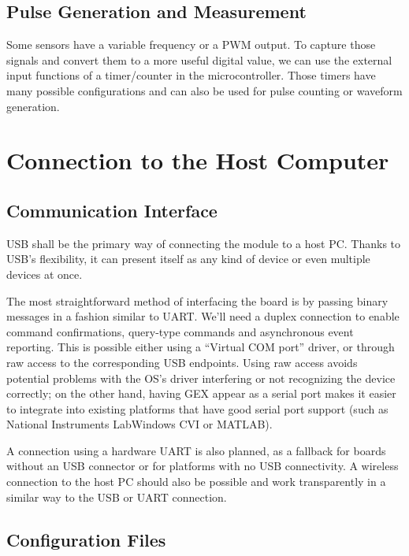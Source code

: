 \subsection{Pulse Generation and Measurement}

Some sensors have a variable frequency or a \gls{PWM} output. To capture those signals and convert them to a more useful digital value, we can use the external input functions of a timer/counter in the microcontroller. Those timers have many possible configurations and can also be used for pulse counting or waveform generation.

\section{Connection to the Host Computer}

\subsection{Communication Interface}

\gls{USB} shall be the primary way of connecting the module to a host \gls{PC}. Thanks to \gls{USB}'s flexibility, it can present itself as any kind of device or even multiple devices at once.

The most straightforward method of interfacing the board is by passing binary messages in a fashion similar to \gls{UART}. We'll need a duplex connection to enable command confirmations, query-type commands and asynchronous event reporting. This is possible either using a ``Virtual COM port'' driver, or through raw access to the corresponding \gls{USB} endpoints. Using raw access avoids potential problems with the \gls{OS}'s driver interfering or not recognizing the device correctly; on the other hand, having GEX appear as a serial port makes it easier to integrate into existing platforms that have good serial port support (such as National Instruments LabWindows CVI or MATLAB).

A connection using a hardware \gls{UART} is also planned, as a fallback for boards without an USB connector or for platforms with no \gls{USB} connectivity. A wireless connection to the host PC should also be possible and work transparently in a similar way to the \gls{USB} or \gls{UART} connection.

\subsection{Configuration Files}

